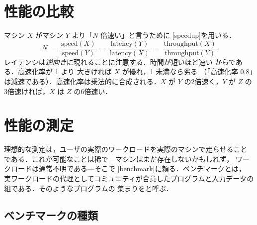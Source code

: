 \documentclass[../main.tex]{subfiles}
\begin{document}
\section{性能の比較}

マシン $X$ がマシン $Y$ より「$N$ 倍速い」と言うために
[speedup]を用いる．
\begin{equation}
  N \;=\; \frac{\text{speed}(X)}{\text{speed}(Y)}
     \;=\; \frac{\text{latency}(Y)}{\text{latency}(X)}
     \;=\; \frac{\text{throughput}(X)}{\text{throughput}(Y)}
  \label{eq:speedup}
\end{equation}
レイテンシは\emph{逆向き}に現れることに注意する．時間が短いほど速い
からである．高速化率が 1 より
大きければ $X$ が優れ，1 未満なら劣る
（「高速化率 0.8」は減速である）．高速化率は乗法的に合成される．$X$ が
$Y$ の2倍速く，$Y$ が $Z$ の3倍速ければ，$X$ は $Z$ の6倍速い．


\section{性能の測定}

理想的な測定は，ユーザの実際のワークロードを実際のマシンで走らせること
である．これが可能なことは稀で---マシンはまだ存在しないかもしれず，
ワークロードは通常不明である---そこで
[benchmark]に頼る．ベンチマークとは，
実ワークロードの代理としてコミュニティが合意したプログラムと入力データの
組である．そのようなプログラムの
集まりをと呼ぶ．

\subsection{ベンチマークの種類}
\end{document}
